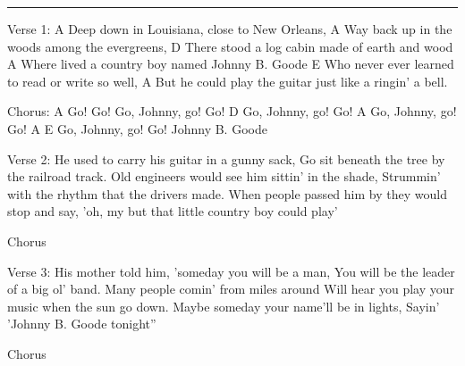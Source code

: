 \noindent\rule{\columnwidth}{1pt}

\begin{lstsong}
Verse 1:
     A
Deep down in Louisiana, close to New Orleans,
A
Way back up in the woods among the evergreens,
      D
There stood a log cabin made of earth and wood
      A
Where lived a country boy named Johnny B. Goode
    E
Who never ever learned to read or write so well,
             A
But he could play the guitar just like a ringin' a bell.

Chorus:
A
Go! Go! Go, Johnny, go! Go!
                  D
Go, Johnny, go! Go!
A
Go, Johnny, go! Go!
A                   E
Go, Johnny, go! Go! Johnny B. Goode

Verse 2:
He used to carry his guitar in a gunny sack,
Go sit beneath the tree by the railroad track.
Old engineers would see him sittin' in the shade,
Strummin' with the rhythm that the drivers made.
When people passed him by they would stop and say,
'oh, my but that little country boy could play'

Chorus

Verse 3:
His mother told him, 'someday you will be a man,
You will be the leader of a big ol' band.
Many people comin' from miles around
Will hear you play your music when the sun go down.
Maybe someday your name'll be in lights,
Sayin' 'Johnny B. Goode tonight''

Chorus
\end{lstsong}
\newpage


